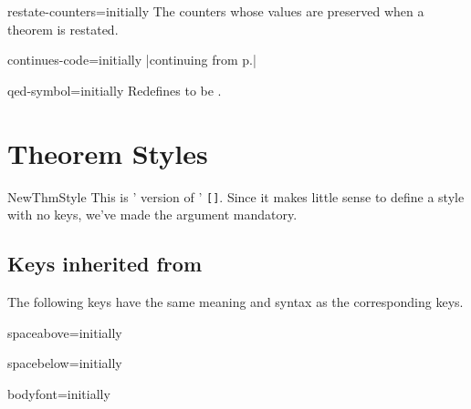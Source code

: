 \documentclass{ltxdoc}
\newcommand{\bracks}[1]{\texttt{[#1]}}
\newcommand{\ttbraces}[1]{\braces{\texttt{#1}}}
\begin{document}
\begin{docKey}{restate-counters}{=}{initially \ttbraces{equation}}
The counters whose values are preserved when a theorem is restated.
\end{docKey}

\begin{docKey}{continues-code}{=}{initially |continuing from p.\cs{,}\ttbraces{\#1}|}

\end{docKey}

\begin{docKey}{qed-symbol}{=}{initially }
Redefines  to be .
\end{docKey}

\section{Theorem Styles}

\begin{docCommand}{NewThmStyle}{}
This is ' version of ' \bracks{}. Since it makes little sense to define a style with no keys, we've made the  argument mandatory.
\end{docCommand}

\subsection{Keys inherited from }

The following keys have the same meaning and syntax as the corresponding  keys.

\begin{docKey}{spaceabove}{=}{initially }

\end{docKey}

\begin{docKey}{spacebelow}{=}{initially }

\end{docKey}

\begin{docKey}{bodyfont}{=}{initially }

\end{docKey}
\end{document}
